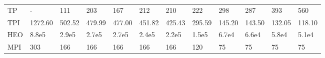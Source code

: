 \begin{table*}
{\begin{tabular}{llllllllllll}
TP       &                - &               111 &               203 &               167 &               212 &              210 &              222 &              298 &              287 &              393 &              560 \\
TPI      &          1272.60 &            502.52 &            479.99 &            477.00 &            451.82 &           425.43 &           295.59 &           145.20 &           143.50 &           132.05 &           118.10 \\
HEO      &            8.8e5 &             2.9e5 &             2.7e5 &             2.7e5 &             2.4e5 &            2.2e5 &            1.5e5 &            6.7e4 &            6.6e4 &            5.8e4 &            5.1e4 \\
MPI      &              303 &               166 &               166 &               166 &               166 &              166 &              120 &               75 &               75 &               75 &               75 \\
\bottomrule
\end{tabular}}
\end{table*}



